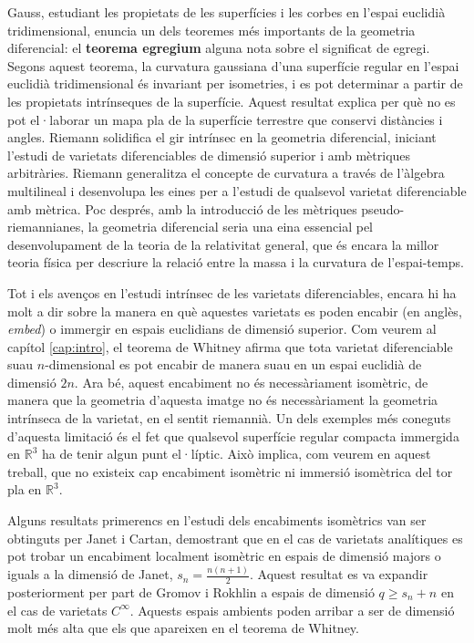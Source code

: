 Gauss, estudiant les propietats de les superfícies i les corbes en l'espai euclidià tridimensional, enuncia un dels teoremes més importants de la geometria diferencial: el \textbf{teorema egregium} {\color{blue} alguna nota sobre el significat de egregi}. Segons aquest teorema, la curvatura gaussiana d'una superfície regular en l'espai euclidià tridimensional és invariant per isometries, i es pot determinar a partir de les propietats intrínseques de la superfície. Aquest resultat explica per què no es pot el·laborar un mapa pla de la superfície terrestre que conservi distàncies i angles.
Riemann solidifica el gir intrínsec en la geometria diferencial, iniciant l'estudi de varietats diferenciables de dimensió superior i amb mètriques arbitràries. Riemann generalitza el concepte de curvatura a través de l'àlgebra multilineal i desenvolupa les eines per a l'estudi de qualsevol varietat diferenciable amb mètrica. Poc després, amb la introducció de les mètriques pseudo-riemannianes, la geometria diferencial seria una eina essencial pel desenvolupament de la teoria de la relativitat general, que és encara la millor teoria física per descriure la relació entre la massa i la curvatura de l'espai-temps.

Tot i els avenços en l'estudi intrínsec de les varietats diferenciables, encara hi ha molt a dir sobre la manera en què aquestes varietats es poden encabir (en anglès, \textit{embed}) o immergir en espais euclidians de dimensió superior. Com veurem al capítol \ref{cap:intro}, el teorema de Whitney afirma que tota varietat diferenciable suau $n$-dimensional es pot encabir de manera suau en un espai euclidià de dimensió $2n$. Ara bé, aquest encabiment no és necessàriament isomètric, de manera que la geometria d'aquesta imatge no és necessàriament la geometria intrínseca de la varietat, en el sentit riemannià. Un dels exemples més coneguts d'aquesta limitació és el fet que qualsevol superfície regular compacta immergida en $\mathbb R^3$ ha de tenir algun punt el·líptic. Això implica, com veurem en aquest treball, que no existeix cap encabiment isomètric ni immersió isomètrica del tor pla en $\mathbb R^3$.

Alguns resultats primerencs en l'estudi dels encabiments isomètrics van ser obtinguts per Janet i Cartan, demostrant que en el cas de varietats analítiques es pot trobar un encabiment localment isomètric en espais de dimensió majors o iguals a la dimensió de Janet, $s_n = \frac{n(n+1)}{2}$. Aquest resultat es va expandir posteriorment per part de Gromov i Rokhlin a espais de dimensió $q\ge s_n+n$ en el cas de varietats $C^\infty$. Aquests espais ambients poden arribar a ser de dimensió molt més alta que els que apareixen en el teorema de Whitney.

